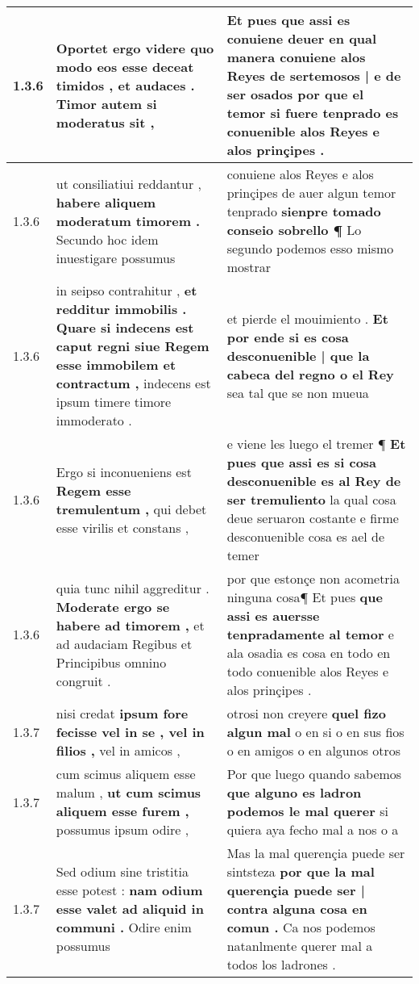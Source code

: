 \begin{tabular}{|p{1cm}|p{6.5cm}|p{6.5cm}|}
1.3.6 & Oportet ergo videre \textbf{ quo modo eos esse deceat timidos , et audaces . } Timor autem si moderatus sit , & Et pues que assi es conuiene deuer \textbf{ en qual manera conuiene alos Reyes de sertemosos | e de ser osados } por que el temor si fuere tenprado es conuenible alos Reyes e alos prinçipes . \\\hline
1.3.6 & ut consiliatiui reddantur , \textbf{ habere aliquem moderatum timorem . } Secundo hoc idem inuestigare possumus & conuiene alos Reyes e alos prinçipes de auer algun temor tenprado \textbf{ sienpre tomado conseio sobrello ¶ } Lo segundo podemos esso mismo mostrar \\\hline
1.3.6 & in seipso contrahitur , \textbf{ et redditur immobilis . Quare si indecens est caput regni siue Regem esse immobilem et contractum , } indecens est ipsum timere timore immoderato . & et pierde el mouimiento . \textbf{ Et por ende si es cosa desconuenible | que la cabeca del regno o el Rey } sea tal que se non mueua \\\hline
1.3.6 & Ergo si inconueniens est \textbf{ Regem esse tremulentum , } qui debet esse virilis et constans , & e viene les luego el tremer ¶ \textbf{ Et pues que assi es si cosa desconuenible es al Rey de ser tremuliento } la qual cosa deue seruaron costante e firme desconuenible cosa es ael de temer \\\hline
1.3.6 & quia tunc nihil aggreditur . \textbf{ Moderate ergo se habere ad timorem , } et ad audaciam Regibus et Principibus omnino congruit . & por que estonçe non acometria ninguna cosa¶ Et pues \textbf{ que assi es auersse tenpradamente al temor } e ala osadia es cosa en todo en todo conuenible alos Reyes e alos prinçipes . \\\hline
1.3.7 & nisi credat \textbf{ ipsum fore fecisse vel in se , vel in filios , } vel in amicos , & otrosi non creyere \textbf{ quel fizo algun mal } o en si o en sus fios o en amigos o en algunos otros \\\hline
1.3.7 & cum scimus aliquem esse malum , \textbf{ ut cum scimus aliquem esse furem , } possumus ipsum odire , & Por que luego quando sabemos \textbf{ que alguno es ladron podemos le mal querer } si quiera aya fecho mal a nos o a \\\hline
1.3.7 & Sed odium sine tristitia esse potest : \textbf{ nam odium esse valet ad aliquid in communi . } Odire enim possumus & Mas la mal querençia puede ser sintsteza \textbf{ por que la mal querençia puede ser | contra alguna cosa en comun . } Ca nos podemos natanlmente querer mal a todos los ladrones . \\\hline

\end{tabular}
